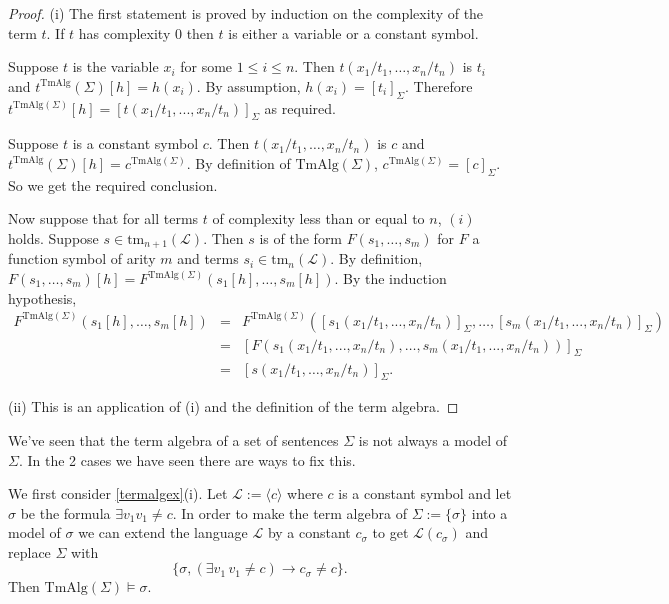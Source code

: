 \documentclass[11pt]{article}
\newcommand{\TmAlg}{\mathrm{TmAlg}}
\newcommand{\tm}{\textrm{tm}}
\newcommand{\mcal}[1]{\mathcal{#1}}
\begin{document}
\begin{proof}
(i) The first statement is proved by induction on the complexity of the term $t$. If $t$ has complexity $0$ then $t$ is either a variable or a constant symbol.

Suppose $t$ is the variable $x_i$ for some $1\leq i\leq n$. Then $t(x_1/t_1,\ldots,x_n/t_n)$ is $t_i$ and $t^\TmAlg(\Sigma)[h]=h(x_i)$. By assumption, $h(x_i)=[t_i]_{\Sigma}$. Therefore $t^{\TmAlg(\Sigma) }[h]=[t(x_1/t_1,...,x_n/t_n)]_\Sigma$ as required.

Suppose $t$ is a constant symbol $c$. Then $t(x_1/t_1,\ldots,x_n/t_n)$ is $c$ and $t^\TmAlg(\Sigma)[h]=c^{\TmAlg(\Sigma)}$. By definition of $\TmAlg(\Sigma)$, $c^{\TmAlg(\Sigma)}=[c]_{\Sigma}$. So we get the required conclusion.

Now suppose that for all terms $t$ of complexity less than or equal to $n$, $(i)$ holds. Suppose $s\in\tm_{n+1}(\mcal{L})$. Then $s$ is of the form $F(s_1,\ldots,s_m)$ for $F$ a function symbol of arity $m$ and terms $s_i\in\tm_n(\mcal{L})$. By definition, $F(s_1,\ldots,s_m)[h]=F^{\TmAlg(\Sigma)}(s_1[h],\ldots,s_m[h])$. By the induction hypothesis,
\begin{eqnarray*}
  F^{\TmAlg(\Sigma)}(s_1[h],\ldots,s_m[h]) &=& F^{\TmAlg(\Sigma)}([s_1(x_1/t_1,...,x_n/t_n)]_\Sigma,\ldots,[s_m(x_1/t_1,...,x_n/t_n)]_\Sigma) \\
   &=& [F(s_1(x_1/t_1,...,x_n/t_n),\ldots,s_m(x_1/t_1,...,x_n/t_n))]_\Sigma \\
   &=& [s(x_1/t_1,\ldots,x_n/t_n)]_\Sigma.
\end{eqnarray*}

\bigskip

\noindent
(ii) This is an application of (i) and the definition of the term algebra.
\end{proof}

We've seen that the term algebra of a set of sentences $\Sigma$ is not always a model of $\Sigma$. In the 2 cases we have seen there are ways to fix this.

We first consider \ref{termalgex}(i). Let $\mcal{L}:=\langle c\rangle$ where $c$ is a constant symbol and let $\sigma$ be the formula $\exists v_1 v_1\neq c$. In order to make the term algebra of $\Sigma:=\{\sigma\}$ into a model of $\sigma$ we can extend the language $\mcal{L}$ by a constant $c_{\sigma}$ to get $\mcal{L}(c_{\sigma})$ and replace $\Sigma$ with \[\{\sigma, (\exists v_1 \, v_1\neq c)\rightarrow c_\sigma\neq c\}.\] Then $\TmAlg(\Sigma)\models \sigma$.
\end{document}
